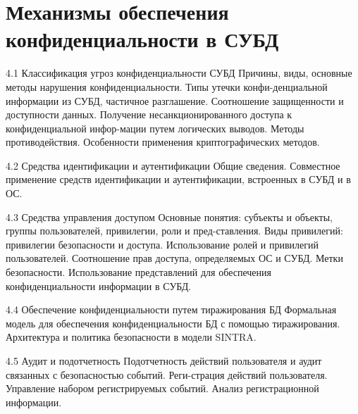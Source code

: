 \section{Механизмы обеспечения конфиденциальности в СУБД}

4.1 Классификация угроз конфиденциальности СУБД
Причины, виды, основные методы нарушения конфиденциальности. Типы утечки конфи-денциальной информации из СУБД, частичное разглашение. Соотношение защищенности и доступности данных. Получение несанкционированного доступа к конфиденциальной инфор-мации путем логических выводов. Методы противодействия. Особенности применения криптографических методов.

4.2 Средства идентификации и аутентификации
Общие сведения. Совместное применение средств идентификации и аутентификации, встроенных в СУБД и  в ОС. 

4.3 Средства управления доступом
Основные понятия: субъекты и объекты, группы пользователей, привилегии, роли и пред-ставления. Виды привилегий: привилегии безопасности и доступа. Использование ролей и привилегий пользователей. Соотношение прав доступа, определяемых ОС и СУБД. Метки безопасности. Использование представлений для обеспечения конфиденциальности информации в СУБД.

4.4 Обеспечение конфиденциальности путем тиражирования БД 
Формальная модель для обеспечения конфиденциальности БД с помощью тиражирования. Архитектура и политика безопасности в модели SINTRA. 

4.5 Аудит и подотчетность
Подотчетность действий пользователя и аудит связанных с безопасностью событий. Реги-страция действий пользователя. Управление набором регистрируемых событий. Анализ регистрационной информации. 